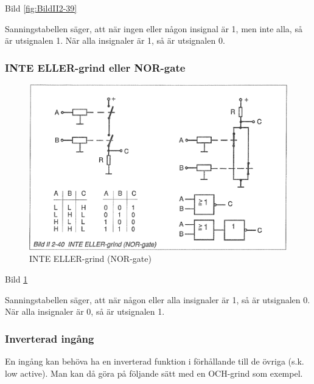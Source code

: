 Bild \ref{fig:BildII2-39}

Sanningstabellen säger, att när ingen eller någon insignal är 1, men inte alla,
så är utsignalen 1. När alla insignaler är 1, så är utsignalen 0.

\subsubsection{INTE ELLER-grind eller NOR-gate}

\begin{figure}
\includegraphics[width=\textwidth]{images/bild_2_2-40}
\caption{INTE ELLER-grind (NOR-gate)}
\label{fig:BildII2-40}
\end{figure}


Bild \ref{fig:BildII2-40}

Sanningstabellen säger, att när någon eller alla insignaler är 1, så är
utsignalen 0. När alla insignaler är 0, så är utsignalen 1.

\subsubsection{Inverterad ingång}

En ingång kan behöva ha en inverterad funktion i förhållande till de övriga
(s.k. low active). Man kan då göra på följande sätt med en OCH-grind som
exempel.

